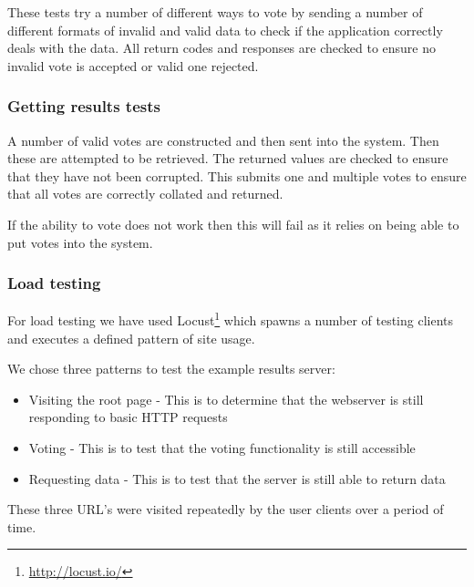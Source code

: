 These tests try a number of different ways to vote by sending a number of different formats of invalid and valid data to check if the application correctly deals with the data. All return codes and responses are checked to ensure no invalid vote is accepted or valid one rejected.

\subsubsection{Getting results tests}

A number of valid votes are constructed and then sent into the system. Then these are attempted to be retrieved. The returned values are checked to ensure that they have not been corrupted. This submits one and multiple votes to ensure that all votes are correctly collated and returned.

If the ability to vote does not work then this will fail as it relies on being able to put votes into the system.

\subsubsection{Load testing}

For load testing we have used Locust\footnote{\url{http://locust.io/}} which spawns a number of testing clients and executes a defined pattern of site usage.

We chose three patterns to test the example results server:

\begin{itemize}
\item Visiting the root page - This is to determine that the webserver is still responding to basic HTTP requests
\item Voting - This is to test that the voting functionality is still accessible
\item Requesting data - This is to test that the server is still able to return data
\end{itemize}

These three URL's were visited repeatedly by the user clients over a period of time.

